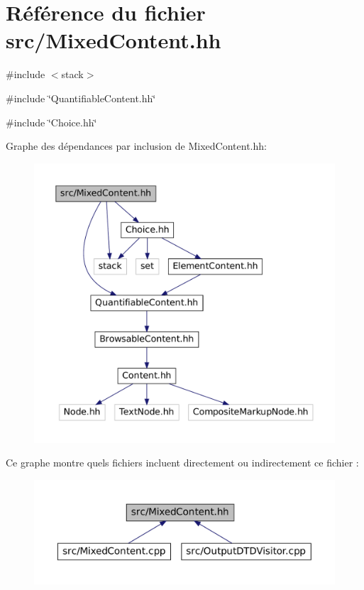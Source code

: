 \hypertarget{_mixed_content_8hh}{
\section{Référence du fichier src/MixedContent.hh}
\label{_mixed_content_8hh}
}
{\ttfamily \#include $<$stack$>$}\par
{\ttfamily \#include \char`\"{}QuantifiableContent.hh\char`\"{}}\par
{\ttfamily \#include \char`\"{}Choice.hh\char`\"{}}\par
Graphe des dépendances par inclusion de MixedContent.hh:
\nopagebreak
\begin{figure}[H]
\begin{center}
\leavevmode
\includegraphics[width=400pt]{_mixed_content_8hh__incl}
\end{center}
\end{figure}
Ce graphe montre quels fichiers incluent directement ou indirectement ce fichier :\nopagebreak
\begin{figure}[H]
\begin{center}
\leavevmode
\includegraphics[width=400pt]{_mixed_content_8hh__dep__incl}
\end{center}
\end{figure}
